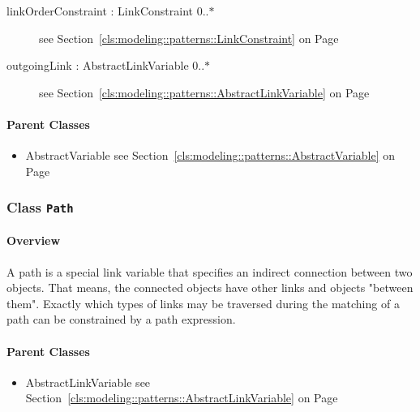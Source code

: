 \begin{description}
\begin{description}
	
\item[linkOrderConstraint : LinkConstraint 			0..$*$]
see Section~\ref{cls:modeling::patterns::LinkConstraint} on Page~\pageref{cls:modeling::patterns::LinkConstraint}\hspace{\fill}
\nopagebreak


	
\item[outgoingLink : AbstractLinkVariable 			0..$*$]
see Section~\ref{cls:modeling::patterns::AbstractLinkVariable} on Page~\pageref{cls:modeling::patterns::AbstractLinkVariable}\hspace{\fill}
\nopagebreak


	
	\end{description}
	

\end{description}

\paragraph{Parent Classes}
\begin{itemize}
\item AbstractVariable see Section~\ref{cls:modeling::patterns::AbstractVariable} on Page~\pageref{cls:modeling::patterns::AbstractVariable}\end{itemize}
\subsubsection{\Large{Class \bfseries \texttt{Path}\normalfont}}
\label{cls:modeling::patterns::Path} 
\paragraph{Overview}

	
			
A path is a special link variable that specifies an indirect connection between two objects. That means, the connected objects have other links and objects "between them". Exactly which types of links may be traversed during the matching of a path can be constrained by a path expression.	
		
	



\paragraph{Parent Classes}
\begin{itemize}
\item AbstractLinkVariable see Section~\ref{cls:modeling::patterns::AbstractLinkVariable} on Page~\pageref{cls:modeling::patterns::AbstractLinkVariable}\end{itemize}
